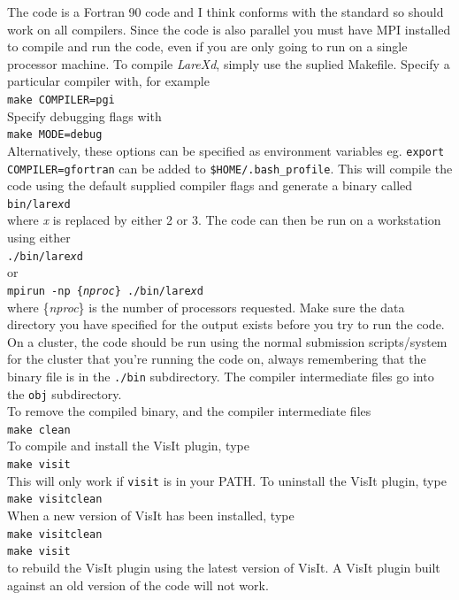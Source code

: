 \documentclass[11pt]{article}
\begin{document}
The code is a Fortran 90 code and I think conforms with the standard so should work on all compilers. Since the code 
is also parallel you must have MPI installed to compile and run the code, even if you are only going to run on a single processor machine.
To compile {\it LareXd}, simply use the suplied Makefile. Specify a particular compiler with, for example \\
\texttt{make COMPILER=pgi}\\
Specify debugging flags with\\ 
\texttt{make MODE=debug}\\
Alternatively, these options can be specified as environment variables
eg. \texttt{export COMPILER=gfortran} can be added to \texttt{\$HOME/.bash\_profile}.
This will compile the code using the default supplied compiler flags and generate a binary called\\
\texttt{bin/lare{\it x}d}\\
where {\it x} is replaced by either 2 or 3. The code can then be run on a workstation using either\\
\texttt{./bin/lare{\it x}d}\\
or\\
\texttt{mpirun -np \{{\it nproc}\} ./bin/lare{\it x}d}\\
where \{{\it nproc}\} is the number of processors requested. Make sure the data directory you have specified for the output exists
before you try to run the code. On a cluster, the
code should be run using the normal submission scripts/system for the cluster
that you're running the code on, always remembering that the binary file is in
the \texttt{./bin} subdirectory. The compiler intermediate files go into the
\texttt{obj} subdirectory. \\

To remove the compiled binary, and the compiler intermediate files\\
\texttt{make clean}\\
To compile and install the VisIt plugin, type\\
\texttt{make visit}\\
This will only work if \texttt{visit} is in your PATH. To uninstall the VisIt plugin, type\\
\texttt{make visitclean}\\
When a new version of VisIt has been installed, type\\
\texttt{make visitclean}\\
\texttt{make visit}\\
to rebuild the VisIt plugin using the latest version of VisIt. A VisIt plugin built against an old version of the code will not work.
\end{document}
